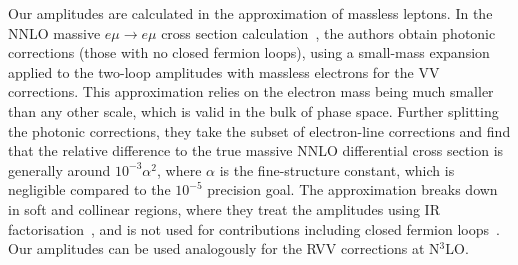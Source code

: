 \documentclass[main.tex]{subfiles}
\begin{document}
Our amplitudes are calculated in the approximation of massless leptons.
In the NNLO massive $e\mu \to e\mu$ cross section calculation~\cite{Broggio:2022htr}, the authors obtain photonic corrections (those with no closed fermion loops), using a small-mass expansion~\cite{Penin:2005eh,Becher:2007cu,Engel:2018fsb} applied to the two-loop amplitudes with massless electrons for the \ac{VV} corrections.
This approximation relies on the electron mass being much smaller than any other scale, which is valid in the bulk of phase space.
Further splitting the photonic corrections, they take the subset of electron-line corrections and find that the relative difference to the true massive NNLO differential cross section is generally around $10^{-3}\alpha^2$, where $\alpha$ is the fine-structure constant, which is negligible compared to the $10^{-5}$ precision goal.
The approximation breaks down in soft and collinear regions, where they treat the amplitudes using IR factorisation~\cite{Banerjee:2021mty,Engel:2021ccn,Engel:2023ifn}, and is not used for contributions including closed fermion loops~\cite{Engel:2018fsb,Engel:2019nfw}.
Our amplitudes can be used analogously for the \ac{RVV} corrections at N$^3$LO.
\end{document}
